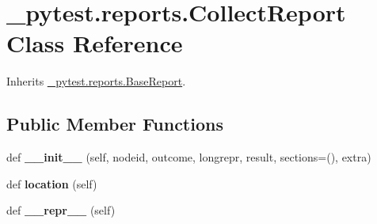 \hypertarget{class__pytest_1_1reports_1_1_collect_report}{}\section{\+\_\+pytest.\+reports.\+Collect\+Report Class Reference}
\label{class__pytest_1_1reports_1_1_collect_report}


Inherits \hyperlink{class__pytest_1_1reports_1_1_base_report}{\+\_\+pytest.\+reports.\+Base\+Report}.

\subsection*{Public Member Functions}
\begin{DoxyCompactItemize}
\item 
\mbox{\label{class__pytest_1_1reports_1_1_collect_report_a6c1e3dcdc7fbddf6c5783d73f3f55c36}} 
def {\bfseries \+\_\+\+\_\+init\+\_\+\+\_\+} (self, nodeid, outcome, longrepr, result, sections=(), extra)
\item 
\mbox{\label{class__pytest_1_1reports_1_1_collect_report_ae09322ef5a0aebfb650f9c41123b6310}} 
def {\bfseries location} (self)
\item 
\mbox{\label{class__pytest_1_1reports_1_1_collect_report_a869a92b2bfc1474f8a4a881e4c999df1}} 
def {\bfseries \+\_\+\+\_\+repr\+\_\+\+\_\+} (self)
\end{DoxyCompactItemize}
